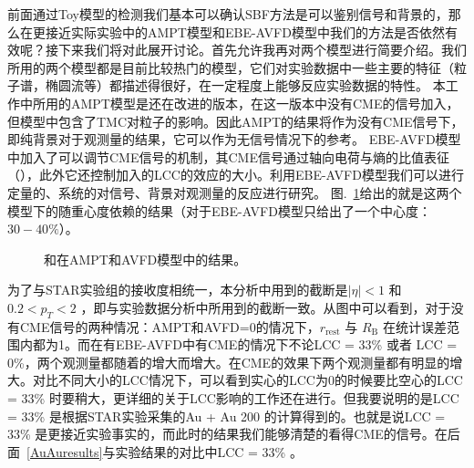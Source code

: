 前面通过Toy模型的检测我们基本可以确认SBF方法是可以鉴别信号和背景的，那么在更接近实际实验中的AMPT模型和EBE-AVFD模型中我们的方法是否依然有效呢？接下来我们将对此展开讨论。首先允许我再对两个模型进行简要介绍。我们所用的两个模型都是目前比较热门的模型，它们对实验数据中一些主要的特征（粒子谱，椭圆流等）都描述得很好，在一定程度上能够反应实验数据的特性。
本工作中所用的AMPT模型是还在改进的版本，在这一版本中没有CME的信号加入，但模型中包含了TMC对粒子的影响。因此AMPT的结果将作为没有CME信号下，即纯背景对于观测量的结果，它可以作为无信号情况下的参考。
EBE-AVFD模型中加入了可以调节CME信号的机制，其CME信号通过轴向电荷与熵的比值表征（\ns ），此外它还控制加入的LCC的效应的大小。利用EBE-AVFD模型我们可以进行定量的、系统的对信号、背景对观测量的反应进行研究。
图.~\ref{fig:realisticmodel}给出的就是这两个模型下的随重心度依赖的结果（对于EBE-AVFD模型只给出了一个中心度：$30-40\%$）。
\begin{figure}[htbp]
\centering
{}
\caption{\rrest 和\rb 在AMPT和AVFD模型中的结果。}
\label{fig:realisticmodel}
\end{figure} 
为了与STAR实验组的接收度相统一，本分析中用到的截断是$|\eta|<1$ 和 $0.2 < p_{T} < 2$ \gevc ，即与实验数据分析中所用到的截断一致。从图中可以看到，对于没有CME信号的两种情况：AMPT和AVFD\ns =0的情况下，$r_{\mathrm{rest}}$ 与 $R_{\mathrm{B}}$ 在统计误差范围内都为1。而在有EBE-AVFD中有CME的情况下不论LCC =  33\% 或者 LCC = 0\%，两个观测量都随着\ns 的增大而增大。在CME的效果下两个观测量都有明显的增大。对比不同大小的LCC情况下，可以看到实心的LCC为0的时候要比空心的LCC = 33\% 时要稍大，更详细的关于LCC影响的工作还在进行。但我要说明的是LCC = 33\% 是根据STAR实验采集的Au + Au 200 \gev 的计算得到的。也就是说LCC = 33\% 是更接近实验事实的，而此时的结果我们能够清楚的看得CME的信号。在后面~\ref{AuAuresults}与实验结果的对比中LCC = 33\% 。



\bigskip

